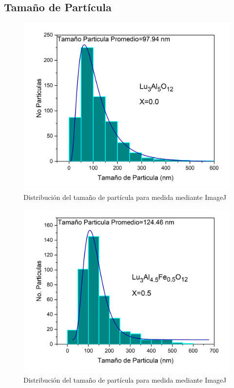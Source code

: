 \begin{appendix}
	\chapter{Tamaño de Partícula}\label{AnexoD}

	\begin{figure}[h]
		\centering%

		\includegraphics[width=13cm]{Kap5/TamG0.png}%
		\caption{Distribución del tamaño de partícula para  medida mediante ImageJ}\label{fig:tamG0}
	\end{figure}

	\begin{figure}[h]
		\centering%

		\includegraphics[width=\textwidth]{Kap5/TamG1.png}%
		\caption{Distribución del tamaño de partícula para  medida mediante ImageJ}\label{fig:tamG1}
	\end{figure}


\end{appendix}
